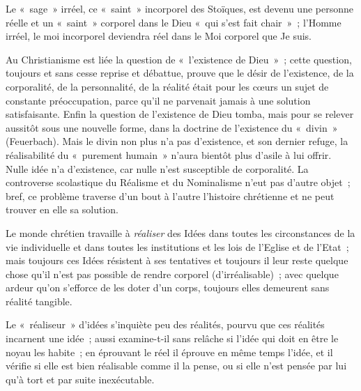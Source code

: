 \documentclass[french,twoside]{book} %
\begin{document}
Le « sage » irréel, ce « saint » incorporel des Stoïques, est devenu une personne réelle et un « saint » corporel dans le Dieu « qui s’est fait chair » ; l’Homme irréel, le moi incorporel deviendra réel dans le Moi corporel que Je suis.\par
Au Christianisme est liée la question de « l’existence de Dieu » ; cette question, toujours et sans cesse reprise et débattue, prouve que le désir de l’existence, de la corporalité, de la personnalité, de la réalité était pour les cœurs un sujet de constante préoccupation, parce qu’il ne parvenait jamais à une solution satisfaisante. Enfin la question de l’existence de Dieu tomba, mais pour se relever aussitôt sous une nouvelle forme, dans la doctrine de l’existence du « divin » (Feuerbach). Mais le divin non plus n’a pas d’existence, et son dernier refuge, la réalisabilité du « purement humain » n’aura bientôt plus d’asile à lui offrir.  Nulle idée n’a d’existence, car nulle n’est susceptible de corporalité. La controverse scolastique du Réalisme et du Nominalisme n’eut pas d’autre objet ; bref, ce problème traverse d’un bout à l’autre l’histoire chrétienne et ne peut trouver en elle sa solution.\par
Le monde chrétien travaille à \emph{réaliser} des Idées dans toutes les circonstances de la vie individuelle et dans toutes les institutions et les lois de l’Eglise et de l’Etat ; mais toujours ces Idées résistent à ses tentatives et toujours il leur reste quelque chose qu’il n’est pas possible de rendre corporel (d’irréalisable) ; avec quelque ardeur qu’on s’efforce de les doter d’un corps, toujours elles demeurent sans réalité tangible.\par
Le « réaliseur » d’idées s’inquiète peu des réalités, pourvu que ces réalités incarnent une idée ; aussi examine-t-il sans relâche si l’idée qui doit en être le noyau les habite ; en éprouvant le réel il éprouve en même temps l’idée, et il vérifie si elle est bien réalisable comme il la pense, ou si elle n’est pensée par lui qu’à tort et par suite inexécutable.\par
\end{document}
